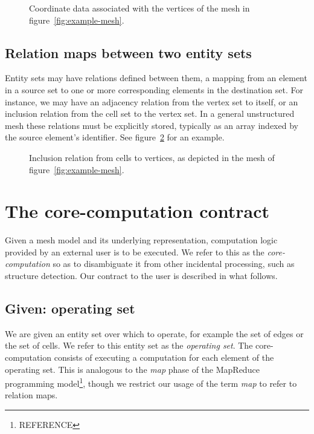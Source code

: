 \begin{figure}
    
    \caption{Coordinate data associated with the vertices of the mesh in figure~\ref{fig:example-mesh}.}
    \label{fig:associative-data}
\end{figure}


\subsection{Relation maps between two entity sets}
Entity sets may have relations defined between them, a mapping from an element in a source set to one or more corresponding elements in the destination set. For instance, we may have an adjacency relation from the vertex set to itself, or an inclusion relation from the cell set to the vertex set.
In a general unstructured mesh these relations must be explicitly stored, typically as an array indexed by the source element's identifier.
See figure~\ref{fig:relation} for an example.

\begin{figure}
    
    \caption{Inclusion relation from cells to vertices, as depicted in the mesh of figure~\ref{fig:example-mesh}.}
    \label{fig:relation}
\end{figure}




\section{The core-computation contract}
Given a mesh model and its underlying representation, computation logic provided by an external user is to be executed. We refer to this as the \emph{core-computation} so as to disambiguate it from other incidental processing, such as structure detection.
Our contract to the user is described in what follows.

\subsection{Given: operating set}
We are given an entity set over which to operate, for example the set of edges or the set of cells. We refer to this entity set as the \emph{operating set}. The core-computation consists of executing a computation for each element of the operating set. This is analogous to the \emph{map} phase of the MapReduce programming model\footnote{REFERENCE}, though we restrict our usage of the term \emph{map} to refer to relation maps.

